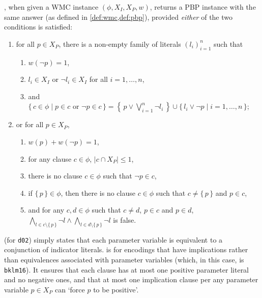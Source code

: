 \begin{theorem}\label{thm:correctness2}
  , when given a WMC instance $(\phi, X_I, X_P, w)$,
  returns a PBP instance with the same answer (as defined in
  \cref{def:wmc,def:pbp}), provided \emph{either} of the two conditions is
  satisfied:
  \begin{enumerate}
    \item for all $p \in X_P$, there is a non-empty family of literals
          ${(l_i)}_{i=1}^n$ such that\label{cond:d02}
          \begin{enumerate}
            \item $w(\neg p) = 1$,
            \item $l_i \in X_I$ or $\neg l_i \in X_I$ for all
                  $i = 1, \dots, n$,\label{condition:equivalence1}
            \item and $\{\, c \in \phi \mid p \in c \text{ or } \neg p \in c \,\} = \left\{\, p \lor \bigvee_{i=1}^n \neg l_i \,\right\} \cup \{\, l_i \lor \neg p \mid i = 1, \dots, n \,\}$;\label{condition:equivalence2}
          \end{enumerate}
    \item or for all $p \in X_P$,\label{cond:bklm16}
          \begin{enumerate}
            \item $w(p) + w(\neg p) = 1$,
            \item for any clause $c \in \phi$,
                  $|c \cap X_P| \le 1$,\label{cond:2b2}
            \item there is no clause $c \in \phi$ such that
                  $\neg p \in c$,\label{cond:2b3}
            \item if $\{\, p \,\} \in \phi$, then there is no clause
                  $c \in \phi$ such that $c \ne \{\, p \,\}$ and
                  $p \in c$,\label{cond:just_parameter}
            \item and for any $c, d \in \phi$ such that $c \ne d$, $p \in c$ and
                  $p \in d$,
                  $\bigwedge_{l \in c \setminus \{\, p \,\}} \neg l \land \bigwedge_{l \in d \setminus \{\, p \,\}} \neg l$
                  is false.\label{cond:disjoint}
          \end{enumerate}
  \end{enumerate}
\end{theorem}

 (for \texttt{d02}) simply states that each parameter variable is
equivalent to a conjunction of indicator literals.  is for
encodings that have implications rather than equivalences associated with
parameter variables (which, in this case, is \texttt{bklm16}). It ensures that
each clause has at most one positive parameter literal and no negative ones, and
that at most one implication clause per any parameter variable $p \in X_P$ can
`force $p$ to be positive'.

